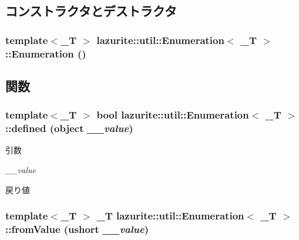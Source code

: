\subsection{コンストラクタとデストラクタ}
\hypertarget{classlazurite_1_1util_1_1_enumeration_3_01___t_01_4_a8a41ed34c656e3b8155e7ddadcf09bf4}{
\subsubsection[{Enumeration}]{\setlength{\rightskip}{0pt plus 5cm}template$<$\_\-T $>$ lazurite::util::Enumeration$<$ \_\-T $>$::Enumeration ()}}
\label{classlazurite_1_1util_1_1_enumeration_3_01___t_01_4_a8a41ed34c656e3b8155e7ddadcf09bf4}


\subsection{関数}
\hypertarget{classlazurite_1_1util_1_1_enumeration_3_01___t_01_4_a821e94d7ce737d9549ece28990c79858}{
\subsubsection[{defined}]{\setlength{\rightskip}{0pt plus 5cm}template$<$\_\-T $>$ bool lazurite::util::Enumeration$<$ \_\-T $>$::defined (object {\em \_\-\_\-value})}}
\label{classlazurite_1_1util_1_1_enumeration_3_01___t_01_4_a821e94d7ce737d9549ece28990c79858}

\begin{DoxyParams}{引数}
\item[{\em \_\-\_\-value}]\end{DoxyParams}
\begin{DoxyReturn}{戻り値}

\end{DoxyReturn}
\hypertarget{classlazurite_1_1util_1_1_enumeration_3_01___t_01_4_aca199574ee23eccb13c149864adeb968}{
\subsubsection[{fromValue}]{\setlength{\rightskip}{0pt plus 5cm}template$<$\_\-T $>$ \_\-T lazurite::util::Enumeration$<$ \_\-T $>$::fromValue (ushort {\em \_\-\_\-value})}}
\label{classlazurite_1_1util_1_1_enumeration_3_01___t_01_4_aca199574ee23eccb13c149864adeb968}

